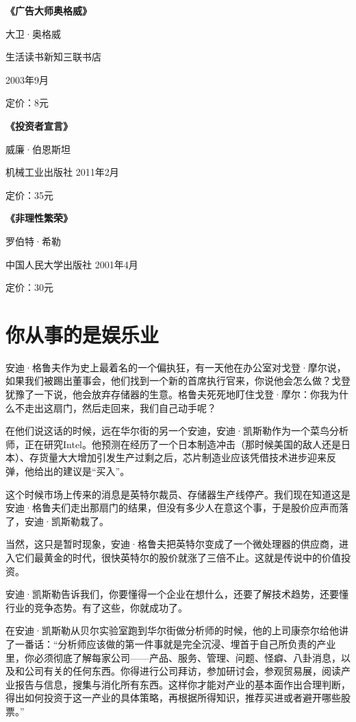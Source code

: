 \textbf{《广告大师奥格威》}

大卫·奥格威

生活读书新知三联书店

2003年9月

定价：8元

\textbf{《投资者宣言》}

威廉·伯恩斯坦

机械工业出版社 2011年2月

定价：35元

\textbf{《非理性繁荣》}

罗伯特·希勒

中国人民大学出版社 2001年4月

定价：30元

\section{你从事的是娱乐业}

安迪·格鲁夫作为史上最着名的一个偏执狂，有一天他在办公室对戈登·摩尔说，如果我们被踢出董事会，他们找到一个新的首席执行官来，你说他会怎么做？戈登犹豫了一下说，他会放弃存储器的生意。格鲁夫死死地盯住戈登·摩尔：你我为什么不走出这扇门，然后走回来，我们自己动手呢？

在他们说这话的时候，远在华尔街的另一个安迪，安迪·凯斯勒作为一个菜鸟分析师，正在研究Intel。他预测在经历了一个日本制造冲击（那时候美国的敌人还是日本）、存货量大大增加引发生产过剩之后，芯片制造业应该凭借技术进步迎来反弹，他给出的建议是``买入''。

这个时候市场上传来的消息是英特尔裁员、存储器生产线停产。我们现在知道这是安迪·格鲁夫们走出那扇门的结果，但没有多少人在意这个事，于是股价应声而落了，安迪·凯斯勒栽了。

当然，这只是暂时现象，安迪·格鲁夫把英特尔变成了一个微处理器的供应商，进入它们最黄金的时代，很快英特尔的股价就涨了三倍不止。这就是传说中的价值投资。

安迪·凯斯勒告诉我们，你要懂得一个企业在想什么，还要了解技术趋势，还要懂行业的竞争态势。有了这些，你就成功了。

在安迪·凯斯勒从贝尔实验室跑到华尔街做分析师的时候，他的上司康奈尔给他讲了一番话：``分析师应该做的第一件事就是完全沉浸、埋首于自己所负责的产业里，你必须彻底了解每家公司------产品、服务、管理、问题、怪癖、八卦消息，以及和公司有关的任何东西。你得进行公司拜访，参加研讨会，参观贸易展，阅读产业报告与信息，搜集与消化所有东西。这样你才能对产业的基本面作出合理判断，得出如何投资于这一产业的具体策略，再根据所得知识，推荐买进或者避开哪些股票。''

